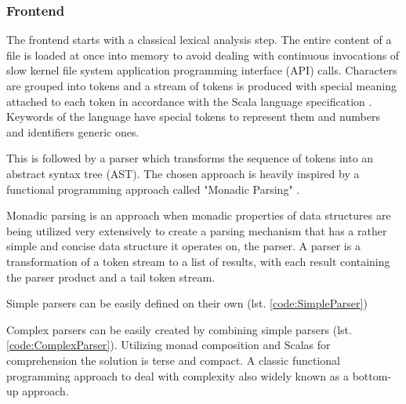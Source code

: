 \documentclass{VUMIFPSbakalaurinis}
\begin{document}
\subsubsection{Frontend}

The frontend starts with a classical lexical analysis step.
The entire content of a file is loaded at once into memory to avoid dealing with continuous invocations of slow kernel file system application programming interface (API) calls.
Characters are grouped into tokens and a stream of tokens is produced with special meaning attached to each token in accordance with the Scala language specification \cite{ScalaSpec}.
Keywords of the language have special tokens to represent them and numbers and identifiers generic ones.

This is followed by a parser which transforms the sequence of tokens into an abstract syntax tree (AST).
The chosen approach is heavily inspired by a functional programming approach called "Monadic Parsing" \cite{MonadicParsing}.

Monadic parsing is an approach when monadic properties of data structures are being utilized very extensively to create a parsing mechanism that has a rather simple and concise data structure it operates on, the parser.
A parser is a transformation of a token stream to a list of results, with each result containing the parser product and a tail token stream.

Simple parsers can be easily defined on their own (lst. \ref{code:SimpleParser})


\noindent
\begin{minipage}{.45\textwidth}
  
\end{minipage}\hfill
\begin{minipage}{.45\textwidth}
  
\end{minipage}

Complex parsers can be easily created by combining simple parsers (lst. \ref{code:ComplexParser}).
Utilizing monad composition and Scalas for comprehension the solution is terse and compact.
A classic functional programming approach to deal with complexity also widely known as a bottom-up approach.
\end{document}
